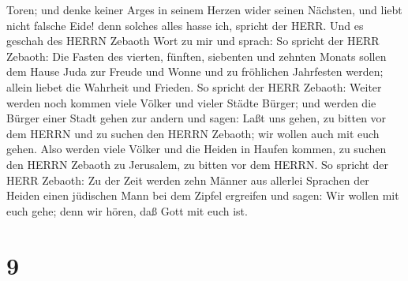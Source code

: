 Toren;  und denke keiner Arges in seinem Herzen wider
seinen Nächsten, und liebt nicht falsche Eide! denn solches alles hasse
ich, spricht der HERR.  Und es geschah des HERRN Zebaoth
Wort zu mir und sprach:  So spricht der HERR Zebaoth: Die
Fasten des vierten, fünften, siebenten und zehnten Monats sollen dem
Hause Juda zur Freude und Wonne und zu fröhlichen Jahrfesten werden;
allein liebet die Wahrheit und Frieden.  So spricht der
HERR Zebaoth: Weiter werden noch kommen viele Völker und vieler Städte
Bürger;  und werden die Bürger einer Stadt gehen zur andern
und sagen: Laßt uns gehen, zu bitten vor dem HERRN und zu suchen den
HERRN Zebaoth; wir wollen auch mit euch gehen.  Also werden
viele Völker und die Heiden in Haufen kommen, zu suchen den HERRN
Zebaoth zu Jerusalem, zu bitten vor dem HERRN.  So spricht
der HERR Zebaoth: Zu der Zeit werden zehn Männer aus allerlei Sprachen
der Heiden einen jüdischen Mann bei dem Zipfel ergreifen und sagen: Wir
wollen mit euch gehe; denn wir hören, daß Gott mit euch ist.

\hypertarget{section-8}{%
\section{9}\label{section-8}}

